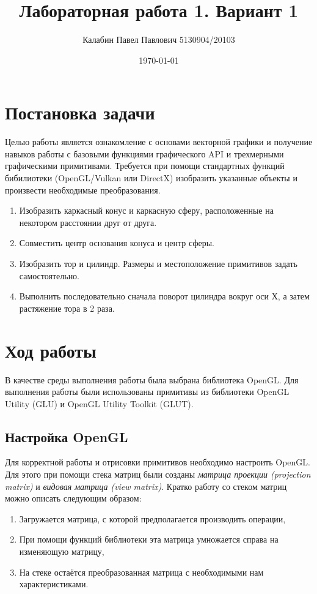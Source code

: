 \documentclass[14pt, final]{extarticle}
\title{Лабораторная работа 1. Вариант 1}
\author{Калабин Павел Павлович 5130904/20103}
\date{\today}
\begin{document}
\maketitle
\section{Постановка задачи}

Целью работы является ознакомление с основами векторной графики и получение 
навыков работы с базовыми функциями графического API и трехмерными графическими примитивами.
Требуется при помощи стандартных функций бибилиотеки (OpenGL/Vulkan или DirectX) изобразить 
указанные объекты и произвести необходимые преобразования.

\begin{enumerate}
    \item Изобразить каркасный конус и каркасную сферу, расположенные на некотором расстоянии друг от друга.
    \item Совместить центр основания конуса и центр сферы.
    \item Изобразить тор и цилиндр. Размеры и местоположение примитивов задать самостоятельно.
    \item Выполнить последовательно сначала поворот цилиндра вокруг оси Х, а затем растяжение тора в 2 раза.
\end{enumerate}

\section {Ход работы}

В качестве среды выполнения работы была выбрана библиотека OpenGL.
Для выполнения работы были использованы примитивы из библиотеки OpenGL
Utility (GLU) и OpenGL Utility Toolkit (GLUT).

\subsection{Настройка OpenGL}

Для корректной работы и отрисовки примитивов необходимо настроить OpenGL.
Для этого при помощи стека матриц были созданы 
\textit{матрица проекции (projection matrix)} и \textit{видовая матрица (view matrix)}.
Кратко работу со стеком матриц можно описать следующим образом: 

\begin{enumerate}
    \item Загружается матрица, с которой предполагается производить операции,
    \item При помощи функций библиотеки эта матрица умножается справа на изменяющую матрицу,
    \item На стеке остаётся преобразованная матрица с необходимыми нам характеристиками. 
\end{enumerate}
\end{document}

